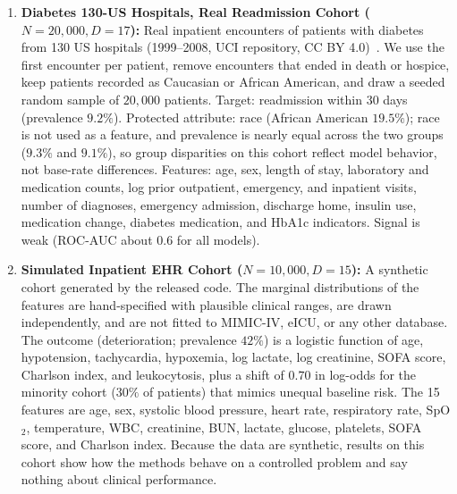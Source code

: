 \documentclass[3p,12pt]{elsarticle}
\theoremstyle{plain}
\theoremstyle{definition}
\begin{document}
\begin{enumerate}
    \item \textbf{Diabetes 130-US Hospitals, Real Readmission Cohort ($N=20{,}000, D=17$):} Real inpatient encounters of patients with diabetes from 130 US hospitals (1999--2008, UCI repository, CC BY 4.0)~\cite{strack2014impact}. We use the first encounter per patient, remove encounters that ended in death or hospice, keep patients recorded as Caucasian or African American, and draw a seeded random sample of $20{,}000$ patients. Target: readmission within 30 days (prevalence $9.2\%$). Protected attribute: race (African American $19.5\%$); race is not used as a feature, and prevalence is nearly equal across the two groups ($9.3\%$ and $9.1\%$), so group disparities on this cohort reflect model behavior, not base-rate differences. Features: age, sex, length of stay, laboratory and medication counts, log prior outpatient, emergency, and inpatient visits, number of diagnoses, emergency admission, discharge home, insulin use, medication change, diabetes medication, and HbA1c indicators. Signal is weak (ROC-AUC about $0.6$ for all models).
    \item \textbf{Simulated Inpatient EHR Cohort ($N=10{,}000, D=15$):} A synthetic cohort generated by the released code. The marginal distributions of the features are hand-specified with plausible clinical ranges, are drawn independently, and are not fitted to MIMIC-IV, eICU, or any other database. The outcome (deterioration; prevalence $42\%$) is a logistic function of age, hypotension, tachycardia, hypoxemia, log lactate, log creatinine, SOFA score, Charlson index, and leukocytosis, plus a shift of $0.70$ in log-odds for the minority cohort ($30\%$ of patients) that mimics unequal baseline risk. The 15 features are age, sex, systolic blood pressure, heart rate, respiratory rate, SpO$_2$, temperature, WBC, creatinine, BUN, lactate, glucose, platelets, SOFA score, and Charlson index. Because the data are synthetic, results on this cohort show how the methods behave on a controlled problem and say nothing about clinical performance.
\end{enumerate}
\end{document}
